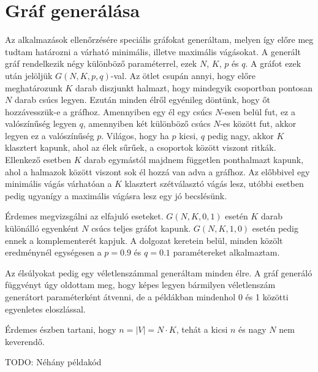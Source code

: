 \section{Gráf generálása}\label{sec:graphGeneration}
Az alkalmazások ellenőrzésére speciális gráfokat generáltam, melyen így előre meg tudtam határozni a várható minimális, illetve maximális vágásokat.
A generált gráf rendelkezik négy különböző paraméterrel, ezek $N$, $K$, $p$ és $q$.
A gráfot ezek után jelöljük $G(N,K,p,q)$-val.
Az ötlet csupán annyi, hogy előre meghatározunk $K$ darab diszjunkt halmazt, hogy mindegyik csoportban pontosan $N$ darab csúcs legyen. Ezután minden élről egyénileg döntünk, hogy őt hozzávesszük-e a gráfhoz. Amennyiben egy él egy csúcs $N$-esen belül fut, ez a valószínűség legyen $q$, amennyiben két különböző csúcs $N$-es között fut, akkor legyen ez a valószínűség $p$. Világos, hogy ha $p$ kicsi, $q$ pedig nagy, akkor $K$ klasztert kapunk, ahol az élek sűrűek, a csoportok között viszont ritkák. Ellenkező esetben $K$ darab egymástól majdnem független ponthalmazt kapunk, ahol a halmazok között viszont sok él hozzá van adva a gráfhoz. Az előbbivel egy minimális vágás várhatóan a $K$ klasztert szétválasztó vágás lesz, utóbbi esetben pedig ugyanígy a maximális vágásra lesz egy jó becslésünk.

Érdemes megvizsgálni az elfajuló eseteket. $G(N,K,0,1)$ esetén $K$ darab különálló egyenként $N$ csúcs teljes gráfot kapunk. $G(N,K,1,0)$ esetén pedig ennek a komplementerét kapjuk. A dolgozat keretein belül, minden közölt eredménynél egységesen a $p=0.9$ és $q=0.1$ paramétereket alkalmaztam.

Az élsúlyokat pedig egy véletlenszámmal generáltam minden élre. A gráf generáló függvényt úgy oldottam meg, hogy képes legyen bármilyen véletlenszám generátort paraméterként átvenni, de a példákban mindenhol 0 és 1 közötti egyenletes eloszlással.



Érdemes észben tartani, hogy $n=|V|=N \cdot K$, tehát a kicsi $n$ és nagy $N$ nem keverendő.

TODO: Néhány példakód

